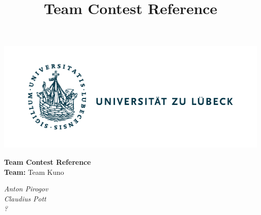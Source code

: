 \documentclass[10pt,a4paper,ngerman,oneside,]{article}
\title{Team Contest Reference}
\author{\university}
\newcommand\teamname{Team Kuno}
\newcommand\teammembers{Anton Pirogov\\ Claudius Pott\\ ?}
\begin{document}
\vspace{-5mm}
\begin{center}
	\begin{minipage}{0.3\textwidth}
	  \includegraphics[scale=.8,clip,trim=.4cm 0cm 6.4cm 0cm,scale=0.89]{img/logo_uzl.pdf}
    \end{minipage}
	\begin{minipage}{0.35\textwidth}
      \begin{center}
	    \LARGE{\bfseries Team Contest Reference}\\
        \textbf{Team:} {\teamname}
      \end{center}
    \end{minipage}
	\begin{minipage}{0.3\textwidth}
      \flushright
      \itshape\teammembers
    \end{minipage}
\end{center}
\thispagestyle{fancy}
\tableofcontents
\end{document}
